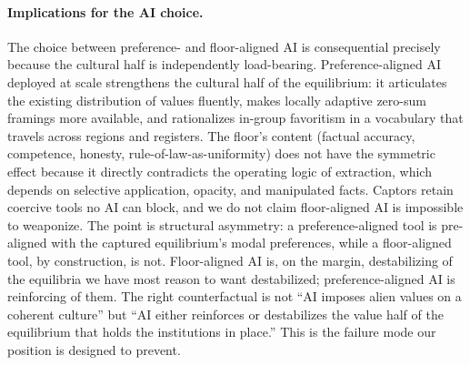 \documentclass{article}
\theoremstyle{plain}
\theoremstyle{definition}
\theoremstyle{remark}
\begin{document}
\paragraph{Implications for the AI choice.} The choice between preference- and floor-aligned AI is consequential precisely because the cultural half is independently load-bearing. Preference-aligned AI deployed at scale strengthens the cultural half of the equilibrium: it articulates the existing distribution of values fluently, makes locally adaptive zero-sum framings more available, and rationalizes in-group favoritism in a vocabulary that travels across regions and registers. The floor's content (factual accuracy, competence, honesty, rule-of-law-as-uniformity) does not have the symmetric effect because it directly contradicts the operating logic of extraction, which depends on selective application, opacity, and manipulated facts. Captors retain coercive tools no AI can block, and we do not claim floor-aligned AI is impossible to weaponize. The point is structural asymmetry: a preference-aligned tool is pre-aligned with the captured equilibrium's modal preferences, while a floor-aligned tool, by construction, is not. Floor-aligned AI is, on the margin, destabilizing of the equilibria we have most reason to want destabilized; preference-aligned AI is reinforcing of them. The right counterfactual is not ``AI imposes alien values on a coherent culture'' but ``AI either reinforces or destabilizes the value half of the equilibrium that holds the institutions in place.'' This is the failure mode our position is designed to prevent.
\end{document}
